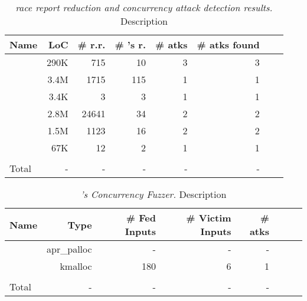 \begin{table}[ht!]
	\footnotesize
	\centering
	\begin{tabular}{l|r|r|r|r|r|r|r}
		{\bf Name} & {\bf LoC} & {\bf \# r.r.}& {\bf \# \xxx's r.} & {\bf \# atks} & {\bf \# atks found}  \\
		\hline
		\apache    &    290K    &   715  &  10   &  3  & 3 \\
		\chrome    &   3.4M   & 1715  &  115 &  1  & 1 \\
		\libsafe   &   3.4K     & 3  & 3 & 1 &  1 \\
		\linux     &     2.8M    & 24641  & 34  &  2  & 2  \\
		\mysql     &    1.5M    & 1123 &  16  &  2  & 2 \\
		\ssdb      &  67K   &  12  &  2  &  1  & 1  \\
		\hline\\[-2.3ex]
		Total      &   -    &  -  &  - &  - & - \\
	\end{tabular}
	\vspace{-.1in}
	\caption{{\em \xxx race report reduction and concurrency attack detection results.} \rm {Description}} 
	\label{tab:eval}
	\vspace{-.2in}
\end{table}



\begin{table}[ht!]
	\footnotesize
	\centering
	\begin{tabular}{l|r|r|r|r|r|r|r}
		{\bf Name} & {\bf Type} & {\bf \# Fed Inputs}& {\bf \# Victim Inputs} & {\bf \# atks}  \\
		\hline
		\apache    &   apr\_palloc   &  -   &  -  & -  \\
		\linux     &  kmalloc  & 180   &  6  &  1   \\
		\hline\\[-2.3ex]
		Total      &    -     &  -  & -  & -\\
	\end{tabular}
	\vspace{-.1in}
	\caption{{\em \xxx's Concurrency Fuzzer.} \rm {Description}} 
	\label{tab:eval}
	\vspace{-.2in}
\end{table}



